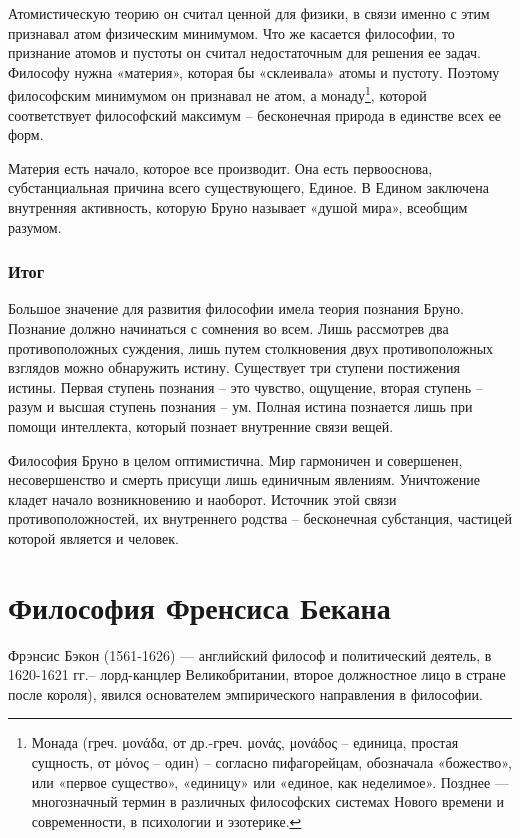 \documentclass[a4paper, 14pt]{extreport}
\begin{document}
Атомистическую теорию он считал ценной для физики, в связи именно с этим
признавал атом физическим минимумом. Что же касается философии, то
признание атомов и пустоты он считал недостаточным для решения ее задач.
Философу нужна «материя», которая бы «склеивала» атомы и пустоту.
Поэтому философским минимумом он признавал не атом, а монаду\footnote{Монада
  (греч. μονάδα, от др.-греч. μονάς, μονάδος -- единица, простая
  сущность, от μόνος -- один) -- согласно пифагорейцам, обозначала
  «божество», или «первое существо», «единицу» или «единое, как
  неделимое». Позднее --- многозначный термин в различных философских
  системах Нового времени и современности, в психологии и эзотерике.},
которой соответствует философский максимум -- бесконечная природа в
единстве всех ее форм.

Материя есть начало, которое все производит. Она есть первооснова,
субстанциальная причина всего существующего, Единое. В Едином заключена
внутренняя активность, которую Бруно называет «душой мира», всеобщим
разумом.

\subsubsection{Итог}

Большое значение для развития философии имела теория познания Бруно.
Познание должно начинаться с сомнения во всем. Лишь рассмотрев два
противоположных суждения, лишь путем столкновения двух противоположных
взглядов можно обнаружить истину. Существует три ступени постижения
истины. Первая ступень познания -- это чувство, ощущение, вторая ступень
-- разум и высшая ступень познания -- ум. Полная истина познается лишь
при помощи интеллекта, который познает внутренние связи вещей.

Философия Бруно в целом оптимистична. Мир гармоничен и совершенен,
несовершенство и смерть присущи лишь единичным явлениям. Уничтожение
кладет начало возникновению и наоборот. Источник этой связи
противоположностей, их внутреннего родства -- бесконечная субстанция,
частицей которой является и человек.

\section{Философия Френсиса Бекана}

Фрэнсис Бэкон (1561-1626) --- английский философ и политический деятель,
в 1620-1621 гг.-- лорд-канцлер Великобритании, второе должностное лицо в
стране после короля), явился основателем эмпирического направления в
философии.
\end{document}
